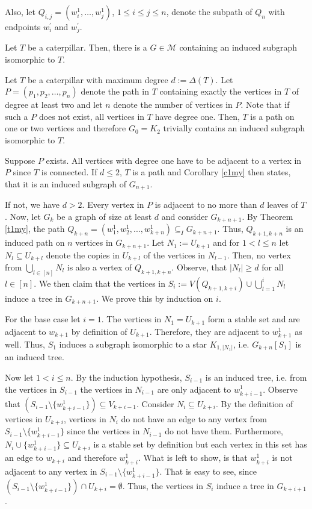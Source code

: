 Also, let $Q_{i,j}=(w_i^1 ,\dots , w_j^1 )$, $1\leq i\leq j\leq n$, denote the subpath of $Q_n$ with endpoints $w_i^\prime$ and $w_j^\prime$.

\begin{thm}
Let $T$ be a caterpillar. Then, there is a $G\in\mathcal{M}$ containing an induced subgraph isomorphic to $T$.
\end{thm}
\begin{prf}
Let $T$ be a caterpillar with maximum degree $d:=\Delta (T)$. Let $P=(p_1, p_2, \dots , p_n)$ denote the path in $T$ containing exactly the vertices in $T$ of degree at least two and let $n$ denote the number of vertices in $P$. Note that if such a $P$ does not exist, all vertices in $T$ have degree one. Then, $T$ is a path on one or two vertices and therefore $G_0=K_2$ trivially contains an induced subgraph isomorphic to $T$.

Suppose $P$ exists. All vertices with degree one have to be adjacent to a vertex in $P$ since $T$ is connected. If $d\leq 2$, $T$ is a path and Corollary \ref{c1my} then states, that it is an induced subgraph of $G_{n+1}$.

If not, we have $d>2$. Every vertex in $P$ is adjacent to no more than $d$ leaves of $T$. Now, let $G_k$ be a graph of size at least $d$ and consider $G_{k+n+1}$. By Theorem \ref{t1my}, the path $Q_{k+n}=(w^1_1,w^1_2,...,w^1_{k+n})\subseteq_I G_{k+n+1}$. Thus, $Q_{k+1,k+n}$ is an induced path on $n$ vertices in $G_{k+n+1}$. Let $N_1:=U_{k+1}$ and for $1<l\leq n$ let $N_l\subseteq U_{k+l}$ denote the copies in $U_{k+l}$ of the vertices in $N_{l-1}$. Then, no vertex from $\bigcup_{l\in [n]}N_l$ is also a vertex of $Q_{k+1,k+n}$. Observe, that $\vert N_l \vert \geq d$ for all $l\in [n]$. We then claim that the vertices in $S_i:=V(Q_{k+1,k+i})\cup\bigcup_{l=1}^i N_l$ induce a tree in $G_{k+n+1}$. We prove this by induction on $i$.

For the base case let $i=1$. The vertices in $N_1=U_{k+1}$ form a stable set  and are adjacent to $w_{k+1}$ by definition of $U_{k+1}$. Therefore, they are adjacent to $w^1_{k+1}$ as well. Thus, $S_1$ induces a subgraph isomorphic to a star $K_{1,\vert N_1\vert}$, i.e. $G_{k+n}[S_1]$ is an induced tree.

Now let $1<i\leq n$. By the induction hypothesis, $S_{i-1}$ is an induced tree, i.e. from the vertices in $S_{i-1}$ the vertices in $N_{i-1}$ are only adjacent to $w_{k+i-1}^1$. Observe that $(S_{i-1}\setminus \lbrace w_{k+i-1}^1\rbrace )\subseteq V_{k+i-1}$. Consider $N_i\subseteq U_{k+i}$. By the definition of vertices in $U_{k+i}$, vertices in $N_i$ do not have an edge to any vertex from $S_{i-1}\setminus \lbrace w_{k+i-1}^1\rbrace$ since the vertices in $N_{i-1}$ do not have them. Furthermore, $N_i\cup\lbrace w_{k+i-1}^1\rbrace \subseteq U_{k+i}$ is a stable set by definition but each vertex in this set has an edge to $w_{k+i}$ and therefore $w_{k+i}^1$. What is left to show, is that $w_{k+i}^1$ is not adjacent to any vertex in $S_{i-1}\setminus \lbrace w_{k+i-1}^1\rbrace$. That is easy to see, since $(S_{i-1}\setminus \lbrace w_{k+i-1}^1\rbrace )\cap U_{k+i}=\emptyset$. Thus, the vertices in $S_i$ induce a tree in $G_{k+i+1}$.


\end{prf}
